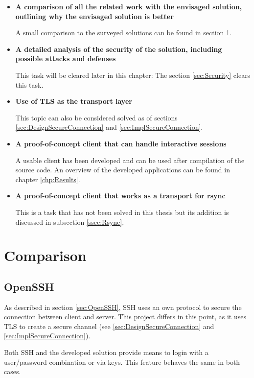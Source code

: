 \documentclass[10pt,a4paper,titlepage,twoside,english,final]{zhawreprt}
\begin{document}
\begin{itemize}
\item \textbf{A comparison of all the related work with the envisaged solution, outlining why the envisaged solution is better}

A small comparison to the surveyed solutions can be found in section \ref{sec:Comparison}.

\item \textbf{A detailed analysis of the security of the solution, including
possible attacks and defenses}

This task will be cleared later in this chapter: The section \ref{sec:Security} clears this task.

\item \textbf{Use of TLS as the transport layer}

This topic can also be considered solved as of sections \ref{sec:DesignSecureConnection} and \ref{sec:ImplSecureConnection}.

\item \textbf{A proof-of-concept client that can handle interactive sessions}

A usable client has been developed and can be used after compilation of the source code.
An overview of the developed applications can be found in chapter \ref{chp:Results}.

\item \textbf{A proof-of-concept client that works as a transport for rsync}

This is a task that has not been solved in this thesis but its addition is discussed in subsection \ref{ssec:Rsync}.
\end{itemize}


\section{Comparison}\label{sec:Comparison}
\subsection{OpenSSH}\label{ssec:CompOpenSSH}
As described in section \ref{sec:OpenSSH}, \gls{SSH} uses an own protocol to secure the connection between client and server.
This project differs in this point, as it uses \gls{TLS} to create a secure channel (see \ref{sec:DesignSecureConnection} and \ref{sec:ImplSecureConnection}).

Both \gls{SSH} and the developed solution provide means to login with a user/password combination or via keys.
This feature behaves the same in both cases.
\end{document}
